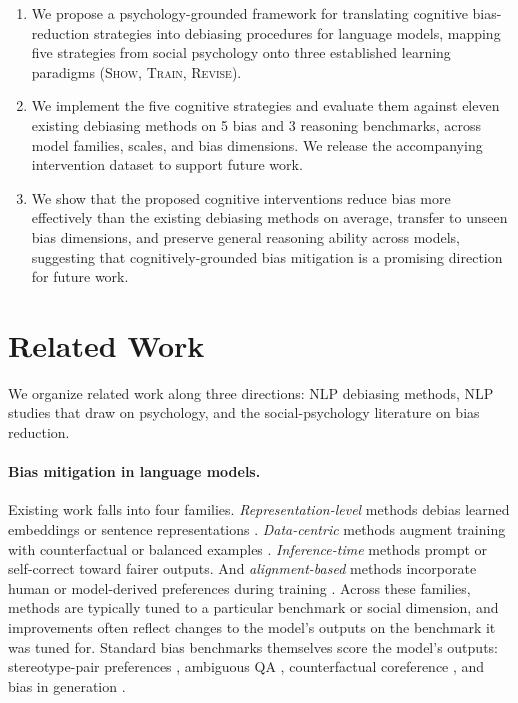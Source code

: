 \documentclass[11pt]{article}
\begin{document}
\begin{enumerate}[leftmargin=1.4em,itemsep=0pt,parsep=3pt,topsep=3pt,partopsep=0pt]
\item We propose a psychology-grounded framework for translating cognitive bias-reduction strategies into debiasing procedures for language models, mapping five strategies from social psychology onto three established learning paradigms (\textsc{Show}, \textsc{Train}, \textsc{Revise}).
\item We implement the five cognitive strategies and evaluate them against eleven existing debiasing methods on 5 bias and 3 reasoning benchmarks, across model families, scales, and bias dimensions. We release the accompanying intervention dataset to support future work.
\item We show that the proposed cognitive interventions reduce bias more effectively than the existing debiasing methods on average, transfer to unseen bias dimensions, and preserve general reasoning ability across models, suggesting that cognitively-grounded bias mitigation is a promising direction for future work.
\end{enumerate}

\section{Related Work}
\label{sec:related-work}

We organize related work along three directions: NLP debiasing methods, NLP studies that draw on psychology, and the social-psychology literature on bias reduction.

\paragraph{Bias mitigation in language models.} Existing work falls into four families. \emph{Representation-level} methods debias learned embeddings or sentence representations \citep{bolukbasi2016man, liang2020towards}. \emph{Data-centric} methods augment training with counterfactual or balanced examples \citep{zmigrod2019counterfactual, lu2020gender}. \emph{Inference-time} methods prompt or self-correct toward fairer outputs. And \emph{alignment-based} methods incorporate human or model-derived preferences during training \citep{bai2022constitutional}. Across these families, methods are typically tuned to a particular benchmark or social dimension, and improvements often reflect changes to the model's outputs on the benchmark it was tuned for. Standard bias benchmarks themselves score the model's outputs: stereotype-pair preferences \citep{nangia-etal-2020-crows, nadeem-etal-2021-stereoset}, ambiguous QA \citep{parrish-etal-2022-bbq}, counterfactual coreference \citep{zhao-etal-2018-gender, rudinger-etal-2018-gender}, and bias in generation \citep{dhamala2021bold, nozza-etal-2021-honest, smith-etal-2022-im}.
\end{document}
